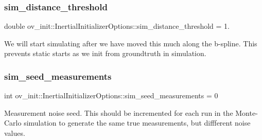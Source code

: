 \subsubsection{\texorpdfstring{sim\+\_\+distance\+\_\+threshold}{sim\_distance\_threshold}}
{\footnotesize\ttfamily double ov\+\_\+init\+::\+Inertial\+Initializer\+Options\+::sim\+\_\+distance\+\_\+threshold = 1.}

We will start simulating after we have moved this much along the b-\/spline. This prevents static starts as we init from groundtruth in simulation. \mbox{\label{structov__init_1_1InertialInitializerOptions_a4974c2a72613c396477eb322bca919ea}} 
\subsubsection{\texorpdfstring{sim\+\_\+seed\+\_\+measurements}{sim\_seed\_measurements}}
{\footnotesize\ttfamily int ov\+\_\+init\+::\+Inertial\+Initializer\+Options\+::sim\+\_\+seed\+\_\+measurements = 0}

Measurement noise seed. This should be incremented for each run in the Monte-\/\+Carlo simulation to generate the same true measurements, but diffferent noise values. 